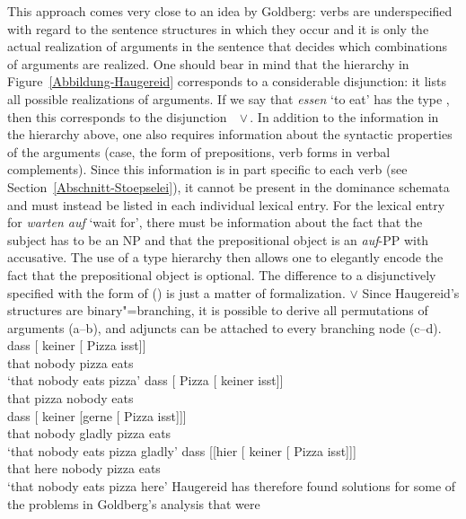 \begin{exe}
\begin{xlist}[iv.]
\begin{exe}
\begin{xlist}[iv.]
This approach comes very close to an idea by Goldberg: verbs are underspecified with regard to the sentence structures in which they occur and
it is only the actual realization of arguments in the sentence that decides which combinations of arguments are realized.
One should bear in mind that the hierarchy in Figure~\ref{Abbildung-Haugereid} corresponds to a considerable disjunction:
it lists all possible realizations of arguments. If we say that \emph{essen} `to eat' has the type , then this
corresponds to the disjunction \,~$\vee$\,. In addition to the information in the hierarchy above, one also requires information about the syntactic properties of
the arguments (case, the form of prepositions, verb forms in verbal complements). Since this information is in part specific to each verb
(see Section~\ref{Abschnitt-Stoepselei}), it cannot be present in the dominance schemata and must instead be listed in each individual
lexical entry. For the lexical entry for \emph{warten auf} `wait for', there must be information about the fact that the subject has to be an
NP and that the prepositional object is an \emph{auf}-PP with accusative. The use of a type hierarchy then allows one to elegantly encode
the fact that the prepositional object is optional. The difference to a disjunctively specified
\subcatl with the form of () is just a matter of formalization.
\ea
\subcat {} $\vee$ 
\z
%
Since Haugereid's structures are binary"=branching, it is possible to derive all permutations of arguments (a--b), and adjuncts can be
attached to every branching node (c--d). 
\eal
\ex 
\gll dass [ keiner [ Pizza isst]]\\
     that {} nobody {} pizza eats\\
\glt `that nobody eats pizza'
\ex 
\gll dass [ Pizza [ keiner isst]]\\
	 that {} pizza {} nobody eats\\
\ex 
\gll dass [ keiner [gerne [ Pizza isst]]]\\
	 that {} nobody \spacebr{}gladly {} pizza eats\\
\glt `that nobody eats pizza gladly'
\ex 
\gll dass [[hier              [ keiner [ Pizza isst]]]\\
     that \hspaceThis{[[}here {}          nobody {} pizza eats\\
\glt `that nobody eats pizza here'
\zl
Haugereid has therefore found solutions for some of the problems in Goldberg's analysis that were

\end{xlist}
\end{exe}
\end{xlist}
\end{exe}
